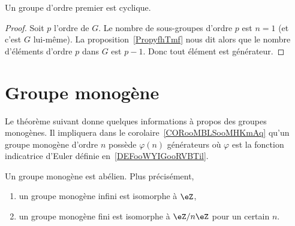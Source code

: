 \begin{corollary}
	Un groupe d'ordre premier est cyclique.
\end{corollary}

\begin{proof}
	Soit \( p\) l'ordre de \( G\). Le nombre de sous-groupes d'ordre \( p\) est \( n=1\) (et c'est \( G\) lui-même). La proposition~\ref{PropyfhTmf} nous dit alors que le nombre d'éléments d'ordre \( p\) dans \( G\) est \( p-1\). Donc tout élément est générateur.
\end{proof}


\section{Groupe monogène}
\label{SECooXIHPooWVSjhT}

Le théorème suivant donne quelques informations à propos des groupes monogènes. Il impliquera dans le corolaire~\ref{CORooMBLSooMHKmAq} qu'un groupe monogène d'ordre \( n\) possède \( \varphi(n)\) générateurs où \( \varphi\) est la fonction indicatrice d'Euler définie en~\ref{DEFooWYIGooRVBTil}.

\begin{theorem}     \label{THOooDOMZooOEYHAe}
	Un groupe monogène est abélien. Plus précisément,
	\begin{enumerate}
		\item
		      un groupe monogène infini est isomorphe à \( \eZ\),
		\item
		      un groupe monogène fini est isomorphe à \( \eZ/n\eZ\) pour un certain \( n\).
	\end{enumerate}
\end{theorem}

